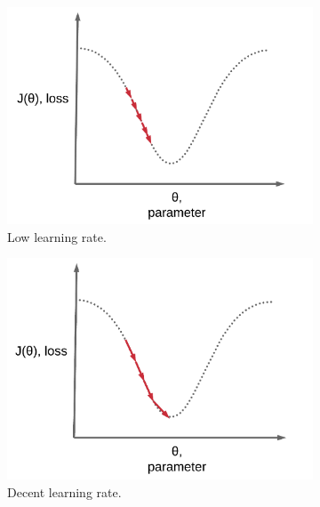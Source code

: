 \begin{figure}[!ht]
  \centering
  \begin{subfigure}[t]{0.45\textwidth}
    \includegraphics[width=\linewidth]{imgs/low-lr.png}
    \caption{Low learning rate.} \label{fig:low-lr}
  \end{subfigure}
  \begin{subfigure}[t]{0.45\textwidth}
    \includegraphics[width=\linewidth]{imgs/decent-lr.png}
    \caption{Decent learning rate.} \label{fig:decent-lr}
  \end{subfigure}\\
  \begin{subfigure}[t]{0.45\textwidth}

\end{subfigure}
\end{figure}
